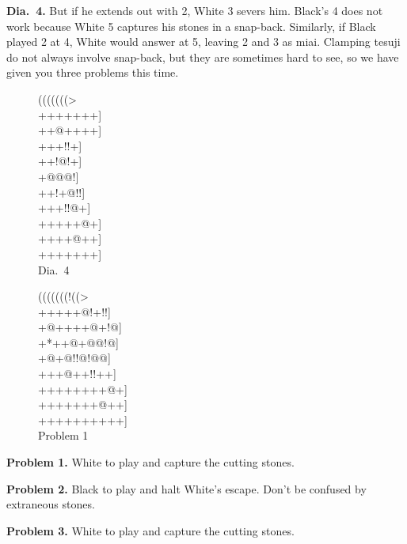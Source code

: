 \documentclass[mcrownvopaper,10pt,twopage,onecolumn,draft,showtrims]{memoir}
\begin{document}
\noindent
\textbf{Dia.\ 4.} But if he extends out with 2, White 3 severs him. Black's 4 does
not work because White 5 captures his stones in a snap-back. Similarly,
if Black played 2 at 4, White would answer at 5, leaving 2 and 3 as miai.
Clamping tesuji do not always involve snap-back, but they are sometimes
hard to see, so we have given you three problems this time.

\begin{figure}[ht]
    \begin{minipage}[c]{0.50\linewidth}
        \centering    
        {\gnos%
        (((((((>\\
        +++++++]\\
        ++@++++]\\
        +++{\gnosw{}}!!+]\\
        ++!{\gnosb{}}@!+]\\
        +{\gnosb{}}@{\gnosw{}}@@!]\\
        ++!+@!!]\\
        +++!!@+]\\
        +++++@+]\\
        ++++@++]\\
        +++++++]\\
        }
        Dia.\ 4
    \end{minipage}%
    \begin{minipage}[c]{0.50\linewidth}
        \centering    
        {\gnos%
        (((((((!((>\\
        +++++@!+!!]\\
        +@++++@+!@]\\
        +*++@+@@!@]\\
        +@+@!!@!@@]\\
        +++@++!!++]\\
        ++++++++@+]\\
        +++++++@++]\\
        ++++++++++]\\
        }
        Problem 1
    \end{minipage}%
\end{figure}

\noindent
\textbf{Problem 1.} White to play and capture the cutting stones.

\noindent
\textbf{Problem 2.} Black to play and halt White's escape. Don't be confused by
extraneous stones.

\noindent
\textbf{Problem 3.} White to play and capture the cutting stones.
\end{document}
